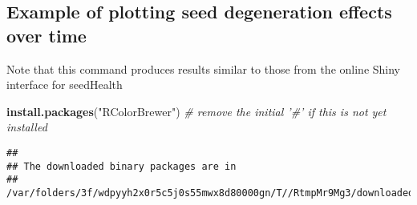 \documentclass[]{article}
\newenvironment{Shaded}{\begin{snugshade}}{\end{snugshade}}
\newcommand{\KeywordTok}[1]{\textcolor[rgb]{0.13,0.29,0.53}{\textbf{#1}}}
\newcommand{\StringTok}[1]{\textcolor[rgb]{0.31,0.60,0.02}{#1}}
\newcommand{\CommentTok}[1]{\textcolor[rgb]{0.56,0.35,0.01}{\textit{#1}}}
\newcommand{\NormalTok}[1]{#1}
\begin{document}
\subsection{Example of plotting seed degeneration effects over
time}\label{example-of-plotting-seed-degeneration-effects-over-time}

Note that this command produces results similar to those from the online
Shiny interface for seedHealth

\begin{Shaded}
\begin{Highlighting}[]
\KeywordTok{install.packages}\NormalTok{(}\StringTok{"RColorBrewer"}\NormalTok{) }\CommentTok{# remove the initial '#' if this is not yet installed}
\end{Highlighting}
\end{Shaded}

\begin{verbatim}
## 
## The downloaded binary packages are in
##  /var/folders/3f/wdpyyh2x0r5c5j0s55mwx8d80000gn/T//RtmpMr9Mg3/downloaded_packages
\end{verbatim}
\end{document}
